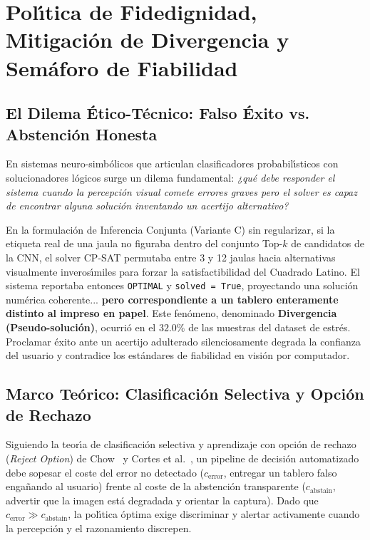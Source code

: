
\section{Pol\'{\i}tica de Fidedignidad, Mitigaci\'on de Divergencia y Sem\'aforo de Fiabilidad}
\label{sec:reliability}

\subsection{El Dilema \'Etico-T\'ecnico: Falso \'Exito vs. Abstenci\'on Honesta}
En sistemas neuro-simb\'olicos que articulan clasificadores probabil\'{\i}sticos con solucionadores l\'ogicos surge un dilema fundamental: \textit{¿qu\'e debe responder el sistema cuando la percepci\'on visual comete errores graves pero el solver es capaz de encontrar alguna soluci\'on inventando un acertijo alternativo?}

En la formulaci\'on de Inferencia Conjunta (Variante C) sin regularizar, si la etiqueta real de una jaula no figuraba dentro del conjunto Top-$k$ de candidatos de la CNN, el solver CP-SAT permutaba entre 3 y 12 jaulas hacia alternativas visualmente inveros\'{\i}miles para forzar la satisfactibilidad del Cuadrado Latino. El sistema reportaba entonces \texttt{OPTIMAL} y \texttt{solved = True}, proyectando una soluci\'on num\'erica coherente... \textbf{pero correspondiente a un tablero enteramente distinto al impreso en papel}. Este fen\'omeno, denominado \textbf{Divergencia (Pseudo-soluci\'on)}, ocurri\'o en el $32.0\%$ de las muestras del dataset de estr\'es. Proclamar \'exito ante un acertijo adulterado silenciosamente degrada la confianza del usuario y contradice los est\'andares de fiabilidad en visi\'on por computador.

\subsection{Marco Te\'orico: Clasificaci\'on Selectiva y Opci\'on de Rechazo}
Siguiendo la teor\'{\i}a de clasificaci\'on selectiva y aprendizaje con opci\'on de rechazo (\textit{Reject Option}) de Chow~\cite{chow1970optimum} y Cortes et al.~\cite{cortes2016learning}, un pipeline de decisi\'on automatizado debe sopesar el coste del error no detectado ($c_{\text{error}}$, entregar un tablero falso enga\~nando al usuario) frente al coste de la abstenci\'on transparente ($c_{\text{abstain}}$, advertir que la imagen est\'a degradada y orientar la captura). Dado que $c_{\text{error}} \gg c_{\text{abstain}}$, la pol\'{\i}tica \'optima exige discriminar y alertar activamente cuando la percepci\'on y el razonamiento discrepen.

